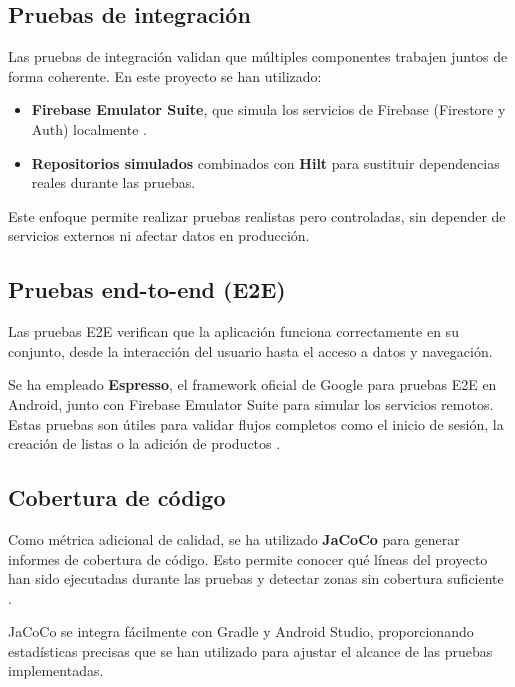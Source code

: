 \subsection{Pruebas de integración}

Las pruebas de integración validan que múltiples componentes trabajen juntos de forma coherente. En este proyecto se han utilizado:

\begin{itemize}
    \item \textbf{Firebase Emulator Suite}, que simula los servicios de Firebase (Firestore y Auth) localmente \cite{firebase-emulator}.
    \item \textbf{Repositorios simulados} combinados con \textbf{Hilt} para sustituir dependencias reales durante las pruebas.
\end{itemize}

Este enfoque permite realizar pruebas realistas pero controladas, sin depender de servicios externos ni afectar datos en producción.

\subsection{Pruebas end-to-end (E2E)}

Las pruebas E2E verifican que la aplicación funciona correctamente en su conjunto, desde la interacción del usuario hasta el acceso a datos y navegación.

Se ha empleado \textbf{Espresso}, el framework oficial de Google para pruebas E2E en Android, junto con Firebase Emulator Suite para simular los servicios remotos. Estas pruebas son útiles para validar flujos completos como el inicio de sesión, la creación de listas o la adición de productos \cite{android-testing}.

\subsection{Cobertura de código}

Como métrica adicional de calidad, se ha utilizado \textbf{JaCoCo} para generar informes de cobertura de código. Esto permite conocer qué líneas del proyecto han sido ejecutadas durante las pruebas y detectar zonas sin cobertura suficiente \cite{jacoco}.

JaCoCo se integra fácilmente con Gradle y Android Studio, proporcionando estadísticas precisas que se han utilizado para ajustar el alcance de las pruebas implementadas.
